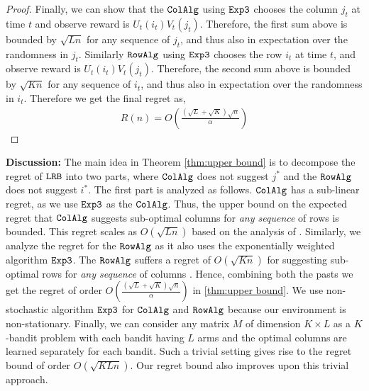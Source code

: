 \begin{proof}

Finally, we can show that the ${\tt ColAlg}$ using ${\tt Exp3}$ chooses the column $j_t$ at time $t$ and observe reward is $U_t(i_t) V_t(j_t)$. Therefore, the first sum above is bounded by $\sqrt{L n}$ for any sequence of $j_t$, and thus also in expectation over the randomness in $j_t$. Similarly ${\tt RowAlg}$ using ${\tt Exp3}$ chooses the row $i_t$ at time $t$, and observe reward is $U_t(i_t) V_t(j_t)$. Therefore, the second sum above is bounded by $\sqrt{K n}$ for any sequence of $i_t$, and thus also in expectation over the randomness in $i_t$. Therefore we get the final regret as,
\begin{align*}
  R(n) = O\left(\frac{\left(\sqrt{L } + \sqrt{K }\right)\sqrt{n}}{\alpha}\right)
\end{align*}
\end{proof}





\textbf{Discussion:} The main idea in Theorem \ref{thm:upper bound} is to decompose the regret of ${\tt LRB}$ into two parts, where ${\tt ColAlg}$ does not suggest $j^*$ and the ${\tt RowAlg}$ does not suggest $i^*$. The first part is analyzed as follows. ${\tt ColAlg}$ has a sub-linear regret, as we use ${\tt Exp3}$ as the ${\tt ColAlg}$. Thus, the upper bound on the expected regret that ${\tt ColAlg}$ suggests sub-optimal columns for \emph{any sequence} of rows is bounded. This regret scales as $O(\sqrt{L n})$ based on the analysis of \citet{auer2002nonstochastic}. Similarly, we analyze the regret for the ${\tt RowAlg}$ as it also uses the exponentially weighted algorithm ${\tt Exp3}$. The ${\tt RowAlg}$ suffers a regret of $O(\sqrt{K n})$ for suggesting sub-optimal rows for \emph{any sequence} of columns . Hence, combining both the pasts we get the regret of order $O\left(\frac{\left(\sqrt{L } + \sqrt{K }\right)\sqrt{n}}{\alpha}\right)$ in \cref{thm:upper bound}. We use non-stochastic algorithm ${\tt Exp3}$ for ${\tt ColAlg}$ and ${\tt RowAlg}$ because our environment is non-stationary. Finally, we can consider any matrix $M$ of dimension $K\times L$ as a $K$-bandit problem with each bandit having $L$ arms and the optimal columns are learned separately for each bandit. Such a trivial setting gives rise to the regret bound of order $O(\sqrt{K L n})$. Our regret bound also improves upon this trivial approach.

